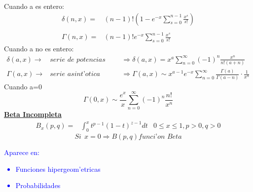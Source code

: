 \documentclass{article}
\theoremstyle{definition}
\begin{document}
Cuando a es entero:
\[
\begin{array}{rl}
	\delta (n,x)=& (n-1)!\left(1-e^{-x}\sum^{n-1}_{s=0}\frac{x^s}{s!}\right)\\
	\\
	\Gamma (n,x)=&(n-1)!e^{-x}\sum^{n-1}_{s=0}\frac{x^s}{s!}
\end{array}
\]
Cuando a no es entero:
\[
\begin{array}{rll}
	\delta (a,x)\rightarrow & \textit{serie de potencias para x pequeno} &\Rightarrow \delta (a,x)=x^a\sum^{\infty}_{n=0}(-1)^n\frac{x^n}{n!(a+n)}\\
	\Gamma (a,x)\rightarrow & \textit{serie asint'otica} &\Rightarrow \Gamma (a,x)\sim x^{a-1}e^{-x}\sum^{\infty}_{n=0}\frac{\Gamma (a)}{\Gamma (a-n)}\cdot\frac{1}{x^n}
\end{array}
\]
Cuando a=0
\[\Gamma (0,x)\sim \frac{e^x}{x}\sum^{\infty}_{n=0}(-1)^n \frac{n!}{x^n}\]
\textbf{\underline{Beta Incompleta}}
\[
\begin{array}{rlr}
	B_x (p,q)=&\int^{x}_0t^{p-1}(1-t)^{z-1}dt
	& 0\leq x\leq 1,p>0,q>0
\end{array}
\]
\[Si\ \ x=0\Rightarrow B(p,q) \textit{funci'on Beta}\]
\textcolor{blue}{Aparece en:\\
\begin{itemize}
	\item Funciones hipergeom'etricas
	\item Probabilidades
\end{itemize}}
\end{document}
